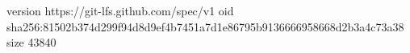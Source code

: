 version https://git-lfs.github.com/spec/v1
oid sha256:81502b374d299f94d8d9ef4b7451a7d1e86795b9136666958668d2b3a4c73a38
size 43840
